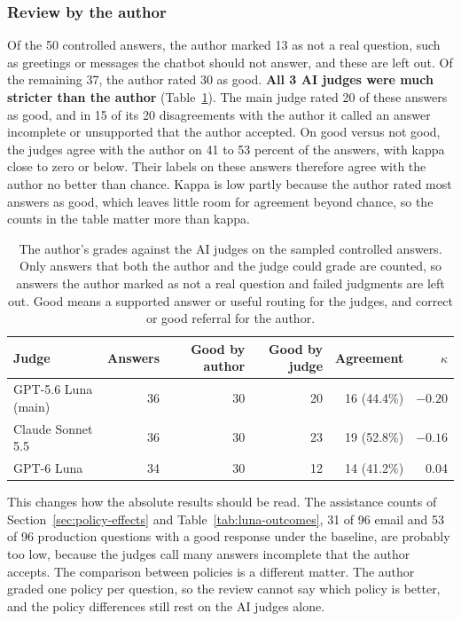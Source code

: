\subsubsection{Review by the author}
\label{sec:author-review}

Of the 50 controlled answers, the author marked 13 as not a real question, such as greetings or messages the chatbot should not answer, and these are left out. Of the remaining 37, the author rated 30 as good. \textbf{All 3 AI judges were much stricter than the author} (Table~\ref{tab:author-review}). The main judge rated 20 of these answers as good, and in 15 of its 20 disagreements with the author it called an answer incomplete or unsupported that the author accepted. On good versus not good, the judges agree with the author on 41 to 53 percent of the answers, with kappa close to zero or below. Their labels on these answers therefore agree with the author no better than chance. Kappa is low partly because the author rated most answers as good, which leaves little room for agreement beyond chance, so the counts in the table matter more than kappa.

\begin{table}[htbp]
\centering
\caption[The author's grades against the AI judges]{The author's grades against the AI judges on the sampled controlled answers. Only answers that both the author and the judge could grade are counted, so answers the author marked as not a real question and failed judgments are left out. Good means a supported answer or useful routing for the judges, and correct or good referral for the author.}
\label{tab:author-review}
\small
\begin{tabular}{@{}lrrrrr@{}}
\toprule
Judge & Answers & Good by author & Good by judge & Agreement & $\kappa$ \\
\midrule
GPT-5.6 Luna (main) & 36 & 30 & 20 & 16 (44.4\%) & $-0.20$ \\
Claude Sonnet 5.5 & 36 & 30 & 23 & 19 (52.8\%) & $-0.16$ \\
GPT-6 Luna & 34 & 30 & 12 & 14 (41.2\%) & 0.04 \\
\bottomrule
\end{tabular}
\end{table}

This changes how the absolute results should be read. The assistance counts of Section~\ref{sec:policy-effects} and Table~\ref{tab:luna-outcomes}, 31 of 96 email and 53 of 96 production questions with a good response under the baseline, are probably too low, because the judges call many answers incomplete that the author accepts. The comparison between policies is a different matter. The author graded one policy per question, so the review cannot say which policy is better, and the policy differences still rest on the AI judges alone.


